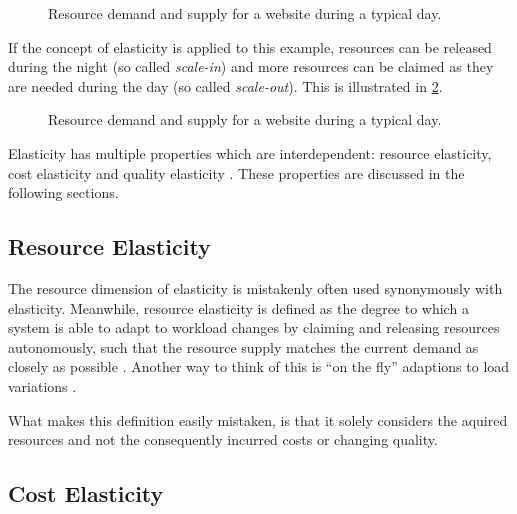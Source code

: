 \begin{figure}
    \centering
    
    \caption{Resource demand and supply for a website during a typical day.}
    \label{fig:elasticity-application-no-scaling}
\end{figure}

If the concept of elasticity is applied to this example, resources can be released during the night (so called \textit{scale-in}) and more resources can be claimed as they are needed during the day (so called \textit{scale-out}). This is illustrated in \cref{fig:elasticity-application-scaling}.

\begin{figure}
    \centering
    
    \caption{Resource demand and supply for a website during a typical day.}
    \label{fig:elasticity-application-scaling}
\end{figure}

Elasticity has multiple properties which are interdependent: resource elasticity, cost elasticity and quality elasticity \cite{dustdarPrinciplesElasticProcesses2011}. These properties are discussed in the following sections.

\subsection{Resource Elasticity}

The resource dimension of elasticity is mistakenly often used synonymously with elasticity. Meanwhile, resource elasticity is defined as the degree to which a system is able to adapt to workload changes by claiming and releasing resources autonomously, such that the resource supply matches the current demand as closely as possible \cite{herbstElasticityCloudComputing2013}. Another way to think of this is ``on the fly'' adaptions to load variations \cite{al-dhuraibiElasticityCloudComputing2018}.

What makes this definition easily mistaken, is that it solely considers the aquired resources and not the consequently incurred costs or changing quality.


\subsection{Cost Elasticity}

